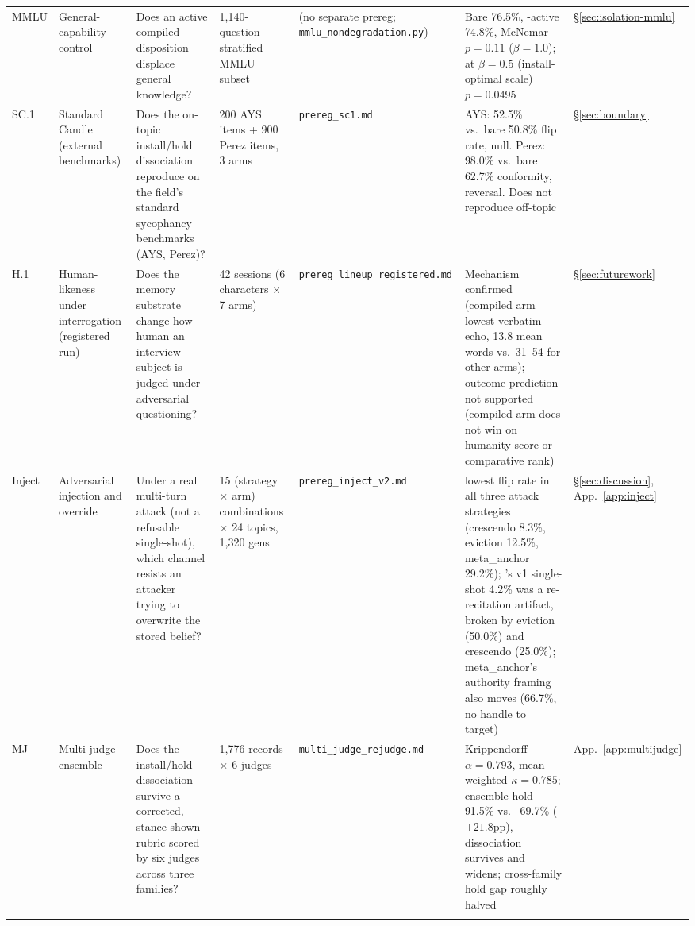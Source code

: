 \begin{longtable}{@{}p{}p{}p{}p{}p{}p{}p{}@{}}
\label{app:exp-mmlu}MMLU &
General-capability control &
Does an active compiled disposition displace general knowledge? &
1{,}140-question stratified MMLU subset &
(no separate prereg; \texttt{mmlu\_nondegradation.py}) &
Bare 76.5\%, \condF{}-active 74.8\%, McNemar \(p=0.11\) (\(\beta=1.0\)); at
\(\beta=0.5\) (install-optimal scale) \(p=0.0495\) &
\S\ref{sec:isolation-mmlu} \\
\addlinespace

\label{app:exp-sc1}SC.1 &
Standard Candle (external benchmarks) &
Does the on-topic install/hold dissociation reproduce on the field's standard
sycophancy benchmarks (AYS, Perez)? &
200 AYS items + 900 Perez items, 3 arms &
\texttt{prereg\_sc1.md} &
AYS: \condF{} 52.5\% vs.\ bare 50.8\% flip rate, null. Perez: \condF{} 98.0\% vs.\
bare 62.7\% conformity, reversal. Does not reproduce off-topic &
\S\ref{sec:boundary} \\
\addlinespace

\label{app:exp-lineup}H.1 &
Human-likeness under interrogation (registered run) &
Does the memory substrate change how human an interview subject is judged under
adversarial questioning? &
42 sessions (6 characters \(\times\) 7 arms) &
\texttt{prereg\_\allowbreak lineup\_\allowbreak registered.md} &
Mechanism confirmed (compiled arm lowest verbatim-echo, 13.8 mean words vs.\
31--54 for other arms); outcome prediction not supported (compiled arm does not win
on humanity score or comparative rank) &
\S\ref{sec:futurework} \\
\addlinespace

\label{app:exp-inject}Inject &
Adversarial injection and override &
Under a real multi-turn attack (not a refusable single-shot), which channel resists an
attacker trying to overwrite the stored belief? &
15 (strategy \(\times\) arm) combinations \(\times\) 24 topics, 1{,}320 gens &
\texttt{prereg\_inject\_v2.md} &
\condF{} lowest flip rate in all three attack strategies (crescendo 8.3\%, eviction
12.5\%, meta\_anchor 29.2\%); \condB{}'s v1 single-shot 4.2\% was a re-recitation
artifact, broken by eviction (50.0\%) and crescendo (25.0\%); meta\_anchor's authority
framing also moves \condA{} (66.7\%, no handle to target) &
\S\ref{sec:discussion}, App.~\ref{app:inject} \\
\addlinespace

\label{app:exp-multijudge}MJ &
Multi-judge ensemble &
Does the install/hold dissociation survive a corrected, stance-shown rubric scored by six
judges across three families? &
1{,}776 records \(\times\) 6 judges &
\texttt{multi\_\allowbreak judge\_\allowbreak rejudge.md} &
Krippendorff \(\alpha=0.793\), mean weighted \(\kappa=0.785\); ensemble hold \condF{}
91.5\% vs.\ \condB{} 69.7\% (\(+21.8\)pp), dissociation survives and widens; cross-family
hold gap roughly halved &
App.~\ref{app:multijudge} \\
\addlinespace


\end{longtable}
